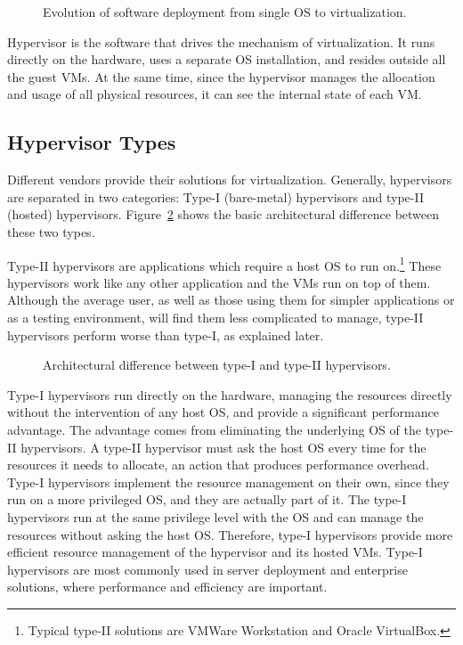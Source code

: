 \begin{figure}
	\centering
	
	\caption{Evolution of software deployment from single \ac{OS} to virtualization.}
	\label{fig:tovirt}
\end{figure}

Hypervisor is the software that drives the mechanism of virtualization. It runs directly on the hardware, uses a separate \ac{OS} installation, and resides outside all the guest \ac{VM}s. At the same time, since the hypervisor manages the allocation and usage of all physical resources, it can see the internal state of each \ac{VM}. 

\subsection{Hypervisor Types}\label{sub:hyptypes}
Different vendors provide their solutions for virtualization. Generally, hypervisors are separated in two categories: Type-I (bare-metal) hypervisors and type-II (hosted) hypervisors. Figure~\ref{fig:hyptypes} shows the basic architectural difference between these two types.

\par Type-II hypervisors are applications which require a host \ac{OS} to run on.\footnote{Typical type-II solutions are VMWare Workstation and Oracle VirtualBox.} These hypervisors work like any other application and the \acp{VM} run on top of them. Although the average user, as well as those using them for simpler applications or as a testing environment, will find them less complicated to manage, type-II hypervisors perform worse than type-I, as explained later. 

\begin{figure}[ht]
	\centering
	
	\caption{Architectural difference between type-I and type-II hypervisors.}
	\label{fig:hyptypes}
\end{figure}

\par Type-I hypervisors run directly on the hardware, managing the resources directly without the intervention of any host \ac{OS}, and provide a significant performance advantage. The advantage comes from eliminating the underlying \ac{OS} of the type-II hypervisors. A type-II hypervisor must ask the host \ac{OS} every time for the resources it needs to allocate, an action that produces performance overhead. Type-I hypervisors implement the resource management on their own, since they run on a more privileged \ac{OS}, and they are actually part of it. The type-I hypervisors run at the same privilege level with the \ac{OS} and can manage the resources without asking the host \ac{OS}. Therefore, type-I hypervisors provide more efficient resource management of the hypervisor and its hosted \acp{VM}. Type-I hypervisors are most commonly used in server deployment and enterprise solutions, where performance and efficiency are important. 

